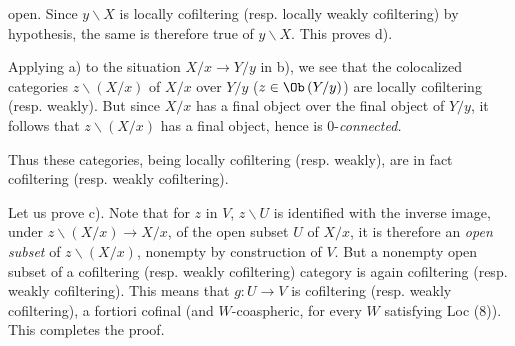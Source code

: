
open. Since $y\backslash X$ is locally cofiltering (resp. locally weakly cofiltering) by hypothesis, the same is therefore true of $y\backslash X$. This proves d).

Applying a) to the situation $X/x \longrightarrow Y/y$ in b), we see that the colocalized categories $z\backslash(X/x)$ of
\margmark{!} %
$X/x$ over $Y/y$ ($z \in \Ob\,(Y/y)$) are locally cofiltering (resp. weakly). But since $X/x$ has a final object over the final object of $Y/y$, it follows that $z\backslash(X/x)$ has a final object, hence is $0$-\textit{connected.}

Thus these categories, being locally cofiltering (resp. weakly), are in fact cofiltering (resp. weakly cofiltering).

Let us prove c). Note that for $z$ in $V$, $z\backslash U$ is identified with the inverse image, under $z\backslash(X/x) \longrightarrow X/x$, of the open subset $U$ of $X/x$, it is therefore an \textit{open subset} of $z\backslash(X/x)$, nonempty by construction of $V$. But a nonempty open subset of a cofiltering (resp. weakly cofiltering) category is again cofiltering (resp. weakly cofiltering). This means that $g : U \longrightarrow V$ is cofiltering (resp. weakly cofiltering), a fortiori cofinal (and $W$-coaspheric, for every $W$ satisfying Loc (8)). This completes the proof.

